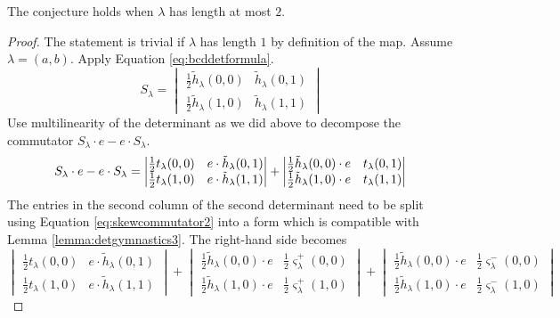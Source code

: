 \begin{proposition}
The conjecture holds when $\lambda$ has length at most $2$.
\end{proposition}
\begin{proof}
The statement is trivial if $\lambda$ has length $1$ by definition of the map. Assume $\lambda = (a, b)$. Apply Equation \eqref{eq:bcddetformula}.
\[
S_\lambda = 
\begin{vmatrix}
\frac{1}{2}\tilde{h}_\lambda(0,0) & \tilde{h}_\lambda(0,1) \\
\frac{1}{2}\tilde{h}_\lambda(1,0) & \tilde{h}_\lambda(1,1)
\end{vmatrix}
\]
Use multilinearity of the determinant as we did above to decompose the commutator $S_\lambda \cdot e - e \cdot S_\lambda$.
\begin{equation*}
S_\lambda \cdot e - e \cdot S_\lambda = 
\begin{vmatrix}
\frac{1}{2} t_\lambda(0,0) & e \cdot \tilde{h}_\lambda(0,1) \\
\frac{1}{2} t_\lambda(1,0) & e \cdot \tilde{h}_\lambda(1,1)
\end{vmatrix}
+
\begin{vmatrix}
\frac{1}{2}\tilde{h}_\lambda(0,0) \cdot e & t_\lambda(0,1) \\
\frac{1}{2}\tilde{h}_\lambda(1,0) \cdot e & t_\lambda(1,1)
\end{vmatrix} \\
\end{equation*}
The entries in the second column of the second determinant need to be split using Equation \eqref{eq:skewcommutator2} into a form which is compatible with Lemma \ref{lemma:detgymnastics3}. The right-hand side becomes
\[
\begin{vmatrix}
\frac{1}{2} t_\lambda(0,0) & e \cdot \tilde{h}_\lambda(0,1) \\
\frac{1}{2} t_\lambda(1,0) & e \cdot \tilde{h}_\lambda(1,1)
\end{vmatrix}
+
\begin{vmatrix}
\frac{1}{2}\tilde{h}_\lambda(0,0) \cdot e & \frac{1}{2} \varsigma_\lambda^+(0,0) \\
\frac{1}{2}\tilde{h}_\lambda(1,0) \cdot e & \frac{1}{2} \varsigma_\lambda^+(1,0)
\end{vmatrix}
+
\begin{vmatrix}
\frac{1}{2}\tilde{h}_\lambda(0,0) \cdot e & \frac{1}{2} \varsigma_\lambda^-(0,0) \\
\frac{1}{2}\tilde{h}_\lambda(1,0) \cdot e & \frac{1}{2} \varsigma_\lambda^-(1,0)

\end{vmatrix}\]
\end{proof}
